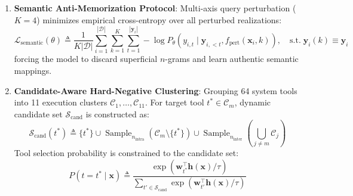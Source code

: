 \documentclass{article}
\begin{document}
\begin{enumerate}
    \item \textbf{Semantic Anti-Memorization Protocol}: Multi-axis query perturbation ($K=4$) minimizes empirical cross-entropy over all perturbed realizations:
    \begin{equation}
    \label{eq:semantic_loss}
    \mathcal{L}_{\text{semantic}}(\theta) \triangleq \frac{1}{K |\mathcal{D}|} \sum_{i=1}^{|\mathcal{D}|} \sum_{k=1}^K \sum_{t=1}^{|\mathbf{y}_i|} -\log P_\theta(y_{i,t} \mid \mathbf{y}_{i,<t}, f_{\text{pert}}(\mathbf{x}_i, k)), \quad \text{s.t.} \; \mathbf{y}_i(k) \equiv \mathbf{y}_i
    \end{equation}
    forcing the model to discard superficial $n$-grams and learn authentic semantic mappings.

    \item \textbf{Candidate-Aware Hard-Negative Clustering}: Grouping 64 system tools into 11 execution clusters $\mathcal{C}_1, \dots, \mathcal{C}_{11}$. For target tool $t^* \in \mathcal{C}_m$, dynamic candidate set $\mathcal{S}_{\text{cand}}$ is constructed as:
    \begin{equation}
    \label{eq:candidate_set}
    \mathcal{S}_{\text{cand}}(t^*) \triangleq \{t^*\} \cup \operatorname{Sample}_{n_{\text{intra}}}(\mathcal{C}_m \setminus \{t^*\}) \cup \operatorname{Sample}_{n_{\text{inter}}}\left(\bigcup_{j \neq m} \mathcal{C}_j\right)
    \end{equation}
    Tool selection probability is constrained to the candidate set:
    \begin{equation}
    \label{eq:candidate_softmax}
    P(t = t^* \mid \mathbf{x}) \triangleq \frac{\exp\left(\mathbf{w}_{t^*}^\top \mathbf{h}(\mathbf{x}) / \tau\right)}{\sum_{t' \in \mathcal{S}_{\text{cand}}} \exp\left(\mathbf{w}_{t'}^\top \mathbf{h}(\mathbf{x}) / \tau\right)}
    \end{equation}


\end{enumerate}
\end{document}
